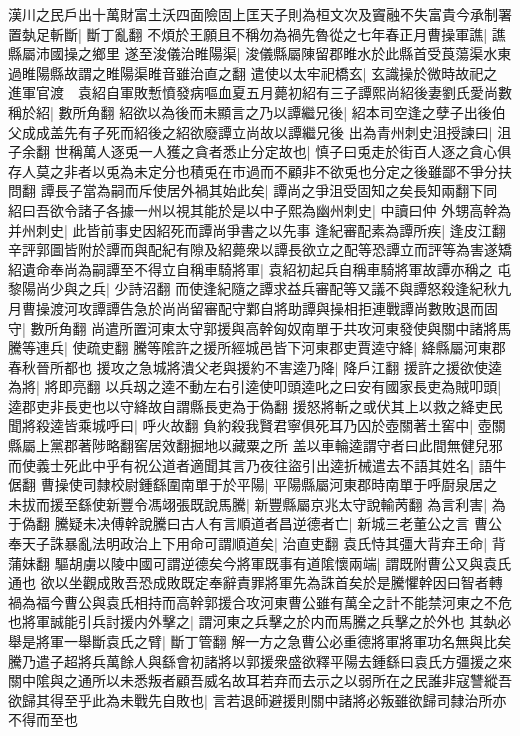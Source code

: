 漢川之民戶出十萬財富土沃四面險固上匡天子則為桓文次及竇融不失富貴今承制署置埶足斬斷|{
	斷丁亂翻}
不煩於王願且不稱勿為禍先魯從之七年春正月曹操軍譙|{
	譙縣屬沛國操之鄉里}
遂至浚儀治睢陽渠|{
	浚儀縣屬陳留郡睢水於此縣首受莨蕩渠水東過睢陽縣故謂之睢陽渠睢音雖治直之翻}
遣使以太牢祀橋玄|{
	玄識操於微時故祀之}
進軍官渡　袁紹自軍敗慙憤發病嘔血夏五月薨初紹有三子譚熙尚紹後妻劉氏愛尚數稱於紹|{
	數所角翻}
紹欲以為後而未顯言之乃以譚繼兄後|{
	紹本司空逢之孽子出後伯父成成盖先有子死而紹後之紹欲廢譚立尚故以譚繼兄後}
出為青州刺史沮授諫曰|{
	沮子余翻}
世稱萬人逐兎一人獲之貪者悉止分定故也|{
	慎子曰兎走於街百人逐之貪心俱存人莫之非者以兎為未定分也積兎在市過而不顧非不欲兎也分定之後雖鄙不爭分扶問翻}
譚長子當為嗣而斥使居外禍其始此矣|{
	譚尚之爭沮受固知之矣長知兩翻下同}
紹曰吾欲令諸子各據一州以視其能於是以中子熙為幽州刺史|{
	中讀曰仲}
外甥高幹為并州刺史|{
	此皆前事史因紹死而譚尚爭書之以先事}
逢紀審配素為譚所疾|{
	逢皮江翻}
辛評郭圖皆附於譚而與配紀有隙及紹薨衆以譚長欲立之配等恐譚立而評等為害遂矯紹遺命奉尚為嗣譚至不得立自稱車騎將軍|{
	袁紹初起兵自稱車騎將軍故譚亦稱之}
屯黎陽尚少與之兵|{
	少詩沼翻}
而使逢紀隨之譚求益兵審配等又議不與譚怒殺逢紀秋九月曹操渡河攻譚譚告急於尚尚留審配守鄴自將助譚與操相拒連戰譚尚數敗退而固守|{
	數所角翻}
尚遣所置河東太守郭援與高幹匈奴南單于共攻河東發使與關中諸將馬騰等連兵|{
	使疏吏翻}
騰等隂許之援所經城邑皆下河東郡吏賈逵守絳|{
	絳縣屬河東郡春秋晉所都也}
援攻之急城將潰父老與援約不害逵乃降|{
	降戶江翻}
援許之援欲使逵為將|{
	將即亮翻}
以兵刼之逵不動左右引逵使叩頭逵叱之曰安有國家長吏為賊叩頭|{
	逵郡吏非長吏也以守絳故自謂縣長吏為于偽翻}
援怒將斬之或伏其上以救之絳吏民聞將殺逵皆乘城呼曰|{
	呼火故翻}
負約殺我賢君寧俱死耳乃囚於壺關著土窖中|{
	壺關縣屬上黨郡著陟略翻窖居效翻掘地以藏粟之所}
盖以車輪逵謂守者曰此間無健兒邪而使義士死此中乎有祝公道者適聞其言乃夜往盜引出逵折械遣去不語其姓名|{
	語牛倨翻}
曹操使司隸校尉鍾繇圍南單于於平陽|{
	平陽縣屬河東郡時南單于呼㕑泉居之}
未拔而援至繇使新豐令馮翊張既說馬騰|{
	新豐縣屬京兆太守說輸苪翻}
為言利害|{
	為于偽翻}
騰疑未决傅幹說騰曰古人有言順道者昌逆德者亡|{
	新城三老董公之言}
曹公奉天子誅暴亂法明政治上下用命可謂順道矣|{
	治直吏翻}
袁氏恃其彊大背弃王命|{
	背蒲妹翻}
驅胡虜以陵中國可謂逆德矣今將軍既事有道隂懷兩端|{
	謂既附曹公又與袁氏通也}
欲以坐觀成敗吾恐成敗既定奉辭責罪將軍先為誅首矣於是騰懼幹因曰智者轉禍為福今曹公與袁氏相持而高幹郭援合攻河東曹公雖有萬全之計不能禁河東之不危也將軍誠能引兵討援内外擊之|{
	謂河東之兵擊之於内而馬騰之兵擊之於外也}
其埶必舉是將軍一舉斷袁氏之臂|{
	斷丁管翻}
解一方之急曹公必重德將軍將軍功名無與比矣騰乃遣子超將兵萬餘人與繇會初諸將以郭援衆盛欲釋平陽去鍾繇曰袁氏方彊援之來關中隂與之通所以未悉叛者顧吾威名故耳若弃而去示之以弱所在之民誰非寇讐縱吾欲歸其得至乎此為未戰先自敗也|{
	言若退師避援則關中諸將必叛雖欲歸司隸治所亦不得而至也}
